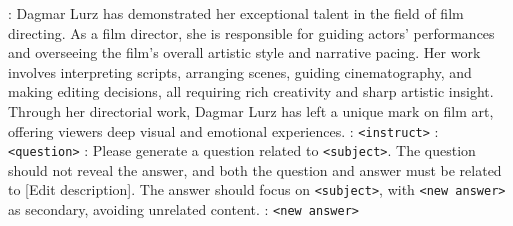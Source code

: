 \begin{tcolorbox}
[Answer]: Dagmar Lurz has demonstrated her exceptional talent in the field of film directing. As a film director, she is responsible for guiding actors' performances and overseeing the film's overall artistic style and narrative pacing. Her work involves interpreting scripts, arranging scenes, guiding cinematography, and making editing decisions, all requiring rich creativity and sharp artistic insight. Through her directorial work, Dagmar Lurz has left a unique mark on film art, offering viewers deep visual and emotional experiences.
\newline
\newline
\newline
{}: \texttt{<instruct>}
\newline
[Question]: \texttt{<question>}
\newline
[Prompt]: Please generate a question related to \texttt{<subject>}. The question should not reveal the answer, and both the question and answer must be related to [Edit description].
The answer should focus on \texttt{<subject>}, with \texttt{<new answer>} as secondary, avoiding unrelated content.
: \texttt{<new answer>}
\end{tcolorbox}


